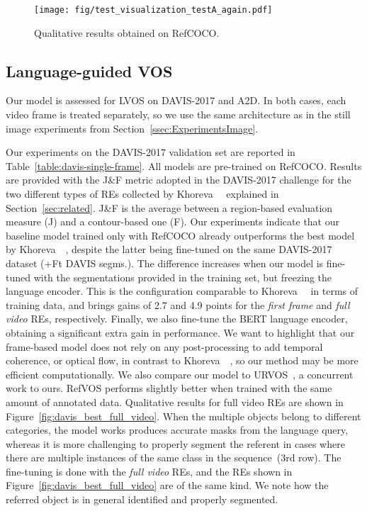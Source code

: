 \documentclass[10pt,twocolumn,letterpaper]{article}
\begin{document}
\begin{figure}[!tbp]
  \centering
    \texttt{[image: fig/test\_visualization\_testA\_again.pdf]}
\caption{Qualitative results obtained on RefCOCO.}
  \label{fig:refcoco_vis}
\end{figure}
 


\subsection{Language-guided VOS}

Our model is assessed for LVOS on DAVIS-2017 and A2D. In both cases, each video frame is treated separately, so we use the same architecture as in the still image experiments from Section~\ref{ssec:ExperimentsImage}.



Our experiments on the DAVIS-2017 validation set are reported in Table~\ref{table:davis-single-frame}. All models are pre-trained on RefCOCO.
Results are provided with the J\&F metric adopted in the DAVIS-2017 challenge for the two different types of REs collected by Khoreva~\etal~\cite{khoreva2018video} explained in Section~\ref{sec:related}. J\&F is the average between a region-based evaluation measure (J) and a contour-based one (F).
Our experiments indicate that our baseline model trained only with RefCOCO already outperforms the best model by Khoreva~\etal~\cite{khoreva2018video}, despite the latter being fine-tuned on the same DAVIS-2017 dataset (+Ft DAVIS segms.).
The difference increases when our model is fine-tuned with the segmentations provided in the training set, but freezing the language encoder.
This is the configuration comparable to Khoreva~\etal~\cite{khoreva2018video} in terms of training data, and brings gains of 2.7 and 4.9 points for the \textit{first frame} and \textit{full video} REs, respectively.
Finally, we also fine-tune the BERT language encoder, obtaining a significant extra gain in performance.
We want to highlight that our frame-based model does not rely on any post-processing to add temporal coherence, or optical flow, in contrast to Khoreva~\etal~\cite{khoreva2018video}, so our method may be more efficient computationally.  We also compare our model to URVOS~\cite{seourvos}, a concurrent work to ours. RefVOS performs slightly better when trained with the same amount of annotated data. Qualitative results for full video REs are shown in Figure~\ref{fig:davis_best_full_video}. When the multiple objects belong to different categories, the model works produces accurate masks from the language query, whereas it is more challenging to properly segment the referent in cases where there are multiple instances of the same class in the sequence~(3rd row). The fine-tuning is done with the \textit{full video} REs, and the REs shown in Figure~\ref{fig:davis_best_full_video} are of the same kind. We note how the referred object is in general identified and properly segmented.
\end{document}
